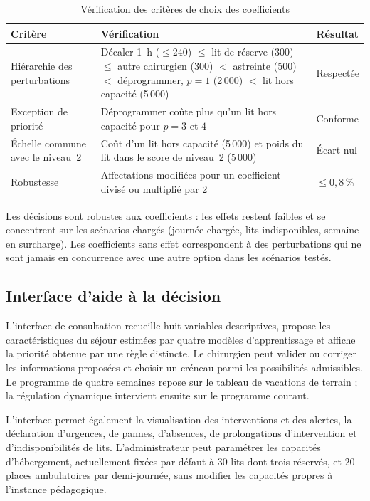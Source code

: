 \documentclass[11pt,a4paper]{article}
\begin{document}
\begin{table}[htbp]
\centering
\caption{Vérification des critères de choix des coefficients}
\label{tab:sma_criteres}
\footnotesize
\begin{tabularx}{\linewidth}{@{}p{3.1cm}Xp{2.2cm}@{}}
\toprule
\textbf{Critère} & \textbf{Vérification} & \textbf{Résultat} \\
\midrule
Hiérarchie des perturbations & Décaler 1~h ($\le 240$) $\le$ lit de réserve (300) $\le$ autre chirurgien (300) $<$ astreinte (500) $<$ déprogrammer, $p=1$ (2\,000) $<$ lit hors capacité (5\,000) & Respectée \\
Exception de priorité & Déprogrammer coûte plus qu'un lit hors capacité pour $p = 3$ et $4$ & Conforme \\
Échelle commune avec le niveau~2 & Coût d'un lit hors capacité (5\,000) et poids du lit dans le score de niveau~2 (5\,000) & Écart nul \\
Robustesse & Affectations modifiées pour un coefficient divisé ou multiplié par 2 & $\le 0{,}8$\,\% \\
\bottomrule
\end{tabularx}
\end{table}



Les décisions sont robustes aux coefficients : les effets restent faibles et se concentrent sur les scénarios chargés (journée chargée, lits indisponibles, semaine en surcharge). Les coefficients sans effet correspondent à des perturbations qui ne sont jamais en concurrence avec une autre option dans les scénarios testés.



\subsection{Interface d'aide à la décision}

L'interface de consultation recueille huit variables descriptives, propose les caractéristiques du séjour estimées par quatre modèles d'apprentissage et affiche la priorité obtenue par une règle distincte. Le chirurgien peut valider ou corriger les informations proposées et choisir un créneau parmi les possibilités admissibles. Le programme de quatre semaines repose sur le tableau de vacations de terrain ; la régulation dynamique intervient ensuite sur le programme courant.

L'interface permet également la visualisation des interventions et des alertes, la déclaration d'urgences, de pannes, d'absences, de prolongations d'intervention et d'indisponibilités de lits. L'administrateur peut paramétrer les capacités d'hébergement, actuellement fixées par défaut à 30 lits dont trois réservés, et 20 places ambulatoires par demi-journée, sans modifier les capacités propres à l'instance pédagogique.
\end{document}
